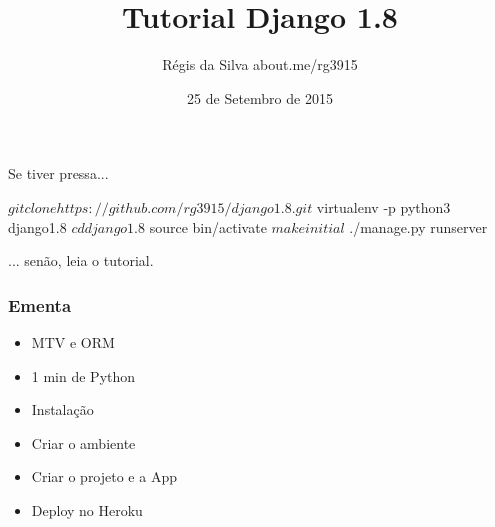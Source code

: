 \documentclass[aspectratio=169]{beamer}
\title{Tutorial Django 1.8}
\author{R\'egis da Silva {\texorpdfstring{\color{blue}}{ }about.me/rg3915}}
\institute{\url{github.com/grupy-sp/encontros}}
\date{25 de Setembro de 2015}
\begin{document}
\justifying %

{%


\begin{frame}

\end{frame}
}

\begin{frame}
	\titlepage
\end{frame}

\begin{frame}[fragile]
	
Se tiver pressa...

\begin{bashcode}
	$ git clone https://github.com/rg3915/django1.8.git
	$ virtualenv -p python3 django1.8
	$ cd django1.8
	$ source bin/activate
	$ make initial
	$ ./manage.py runserver
\end{bashcode}

... sen\~ao, leia o tutorial.

\end{frame}

\begin{frame}\frametitle{Ementa}

\begin{itemize}
	\item MTV e ORM
	\item 1 min de Python
	\item Instala\c c\~ao
	\item Criar o ambiente
	\item Criar o projeto e a App
	\item Deploy no Heroku
\end{itemize}

\end{frame}
\end{document}
